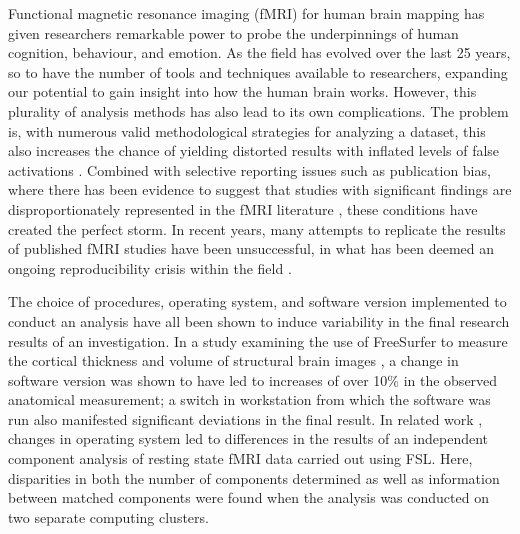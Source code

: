 Functional magnetic resonance imaging (fMRI) for human brain mapping has given researchers remarkable power to probe the underpinnings of human cognition, behaviour, and emotion. As the field has evolved over the last 25 years, so to have the number of tools and techniques available to researchers, expanding our potential to gain insight into how the human brain works. However, this plurality of analysis methods has also lead to its own complications. The problem is, with numerous valid methodological strategies for analyzing a dataset, this also increases the chance of yielding distorted results with inflated levels of false activations \citep{Hong2019-qr,Ioannidis2005-sy,Wager2009-gm}. Combined with selective reporting issues such as publication bias, where there has been evidence to suggest that studies with significant findings are disproportionately represented in the fMRI literature \citep{David2013-iz,Ioannidis2014-yn}, these conditions have created the perfect storm. In recent years, many attempts to replicate the results of published fMRI studies have been unsuccessful, in what has been deemed an ongoing reproducibility crisis within the field \citep{Poldrack2017-rr,Gorgolewski2016-fk,Open_Science_Collaboration2015-gr}.

The choice of procedures, operating system, and software version implemented to conduct an analysis have all been shown to induce variability in the final research results of an investigation. In a study examining the use of FreeSurfer to measure the cortical thickness and volume of structural brain images \citep{Gronenschild2012-gf}, a change in software version was shown to have led to increases of over 10\% in the observed anatomical measurement; a switch in workstation from which the software was run also manifested significant deviations in the final result. In related work \citep{Glatard2015-ml}, changes in operating system led to differences in the results of an independent component analysis of resting state fMRI data carried out using FSL. Here, disparities in both the number of components determined as well as information between matched components were found when the analysis was conducted on two separate computing clusters. 

